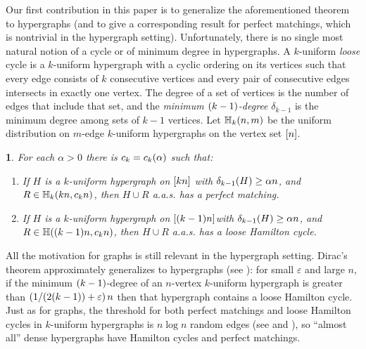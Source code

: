 \documentclass[11pt,english]{article}
\theoremstyle{plain}
\newtheorem{thm}{\protect\theoremname}
\theoremstyle{definition}
\theoremstyle{definition}
\theoremstyle{plain}
\theoremstyle{plain}
\theoremstyle{plain}
\theoremstyle{plain}
\theoremstyle{remark}
\theoremstyle{remark}
\let\originalleft\left
\let\originalright\right
\renewcommand{\left}{\mathopen{}\mathclose\bgroup\originalleft}
\renewcommand{\right}{\aftergroup\egroup\originalright}
\providecommand{\theoremname}{Theorem}
\begin{document}
Our first contribution in this paper is to generalize the aforementioned
theorem to hypergraphs (and to give a corresponding result for perfect
matchings, which is nontrivial in the hypergraph setting). Unfortunately,
there is no single most natural notion of a cycle or of minimum degree
in hypergraphs. A $k$-uniform \emph{loose} cycle is a $k$-uniform
hypergraph with a cyclic ordering on its vertices such that every
edge consists of $k$ consecutive vertices and every pair of consecutive
edges intersects in exactly one vertex. The degree of a set of vertices
is the number of edges that include that set, and the \emph{minimum
$\left(k-1\right)$-degree }$\delta_{k-1}$ is the minimum degree
among sets of $k-1$ vertices. Let $\HH_{k}\left(n,m\right)$ be
the uniform distribution on $m$-edge $k$-uniform hypergraphs on
the vertex set $\range n$.
\begin{thm}
\label{thm:hypergraph-theorems}For each $\alpha>0$ there is $\chyp=\chyp\left(\alpha\right)$ such that:

\begin{enumerate}[topsep=0px,label=(\alph*)]

\item{\label{itm:hypergraph-matching-theorem}If $H$ is
a $k$-uniform hypergraph on $\left[kn\right]$ with $\delta_{k-1}\left(H\right)\ge\alpha n$,
and $R\in\HH_{k}\left(kn,\chypmat n\right)$, then
$H\cup R$ a.a.s. has a perfect matching.}

\item{\label{itm:hypergraph-cycle-theorem}If $H$ is
a $k$-uniform hypergraph on $\left[\left(k-1\right)n\right]$with
$\delta_{k-1}\left(H\right)\ge\alpha n$, and $R\in\HH\left(\left(k-1\right)n,\chypham n\right)$,
then $H\cup R$ a.a.s. has a loose Hamilton cycle.}

\end{enumerate}
\end{thm}
All the motivation for graphs is still relevant in the hypergraph setting. Dirac's theorem approximately generalizes to hypergraphs (see \cite{KKMO11}): for small $\varepsilon$ and large $n$, if the minimum $\left(k-1\right)$-degree of an $n$-vertex $k$-uniform hypergraph is greater than $\left(1/\left(2\left(k-1\right)\right)+\varepsilon\right)\,n$ then that hypergraph contains a loose Hamilton cycle. Just as for graphs, the threshold for both perfect matchings and loose Hamilton cycles in $k$-uniform hypergraphs is $n\log n$ random
edges (see \cite{DF11} and \cite[Corollary~2.6]{JKV08}), so ``almost
all'' dense hypergraphs have Hamilton cycles and perfect matchings.
\end{document}
